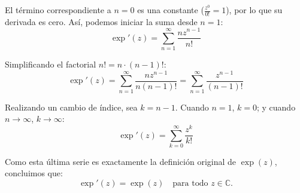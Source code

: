 \documentclass[11pt,a4paper]{article}
\theoremstyle{definition}
\theoremstyle{plain}
\theoremstyle{remark}
\begin{document}
	El término correspondiente a $n=0$ es una constante ($\frac{z^0}{0!} = 1$), por lo que su derivada es cero. Así, podemos iniciar la suma desde $n=1$:
	\[
	\exp'(z) = \sum_{n=1}^\infty \frac{n z^{n-1}}{n!}
	\]
	
	Simplificando el factorial $n! = n \cdot (n-1)!$:
	\[
	\exp'(z) = \sum_{n=1}^\infty \frac{n z^{n-1}}{n(n-1)!} = \sum_{n=1}^\infty \frac{z^{n-1}}{(n-1)!}
	\]
	
	Realizando un cambio de índice, sea $k = n - 1$. Cuando $n = 1$, $k = 0$; y cuando $n \to \infty$, $k \to \infty$:
	\[
	\exp'(z) = \sum_{k=0}^\infty \frac{z^k}{k!}
	\]
	
	Como esta última serie es exactamente la definición original de $\exp(z)$, concluimos que:
	\[
	\exp'(z) = \exp(z) \quad \text{para todo } z \in \mathbb{C}.
	\]
	
\end{document}
